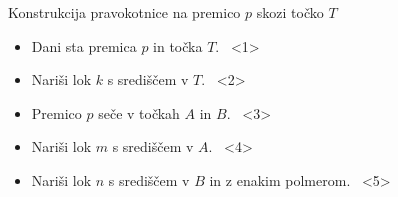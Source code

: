 \begin{frame}{Konstrukcija pravokotnice na premico $p$ skozi točko $T$}

		  \begin{itemize}[<+->]
			\centering
			 \item Dani sta premica $p$ in točka $T$. \ <1>
			 \item Nariši lok $k$ s središčem v $T$. \ <2>
			 \item Premico $p$ seče v točkah $A$ in $B$. \ <3>
			 \item Nariši lok $m$ s središčem v $A$. \ <4>
			 \item Nariši lok $n$ s središčem v $B$ in z enakim polmerom. \ <5>

\end{itemize}
\end{frame}
